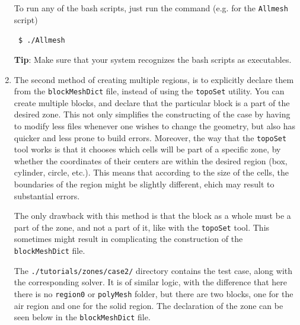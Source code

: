\documentclass{article}
\newcommand\tab[1][0.5cm]{\hspace*{#1}}
\begin{document}
\begin{enumerate}[3.1]
	
	To run any of the bash scripts, just run the command (e.g. for the {\tt Allmesh} script)
	
	{\tt 
	\tab \$ ./Allmesh	
	}
	
	\textbf{Tip}: Make sure that your system recognizes the bash scripts as executables.
	
	
	\item The second method of creating multiple regions, is to explicitly declare them from the {\tt blockMeshDict} file, instead of using the {\tt topoSet} utility. You can create multiple blocks, and declare that the particular block is a part of the desired zone. This not only simplifies the constructing of the case by having to modify less files whenever one wishes to change the geometry, but also has quicker and less prone to build errors. Moreover, the way that the {\tt topoSet} tool works is that it chooses which cells will be part of a specific zone, by whether the coordinates of their centers are within the desired region (box, cylinder, circle, etc.). This means that according to the size of the cells, the boundaries of the region might be slightly different, ehich may result to substantial errors.
	
	The only drawback with this method is that the block as a whole must be a part of the zone, and not a part of it, like with the {\tt topoSet} tool. This sometimes might result in complicating the construction of the {\tt blockMeshDict} file. 
	
	The {\tt ./tutorials/zones/case2/} directory contains the test case, along with the corresponding solver. It is of similar logic, with the difference that here there is no {\tt region0} or {\tt polyMesh} folder, but there are two blocks, one for the air region and one for the solid region. The declaration of the zone can be seen below in the {\tt blockMeshDict} file.
	
	
	\begin{myframe}
	{\tt 
		
}
\end{myframe}
\end{enumerate}
\end{document}
